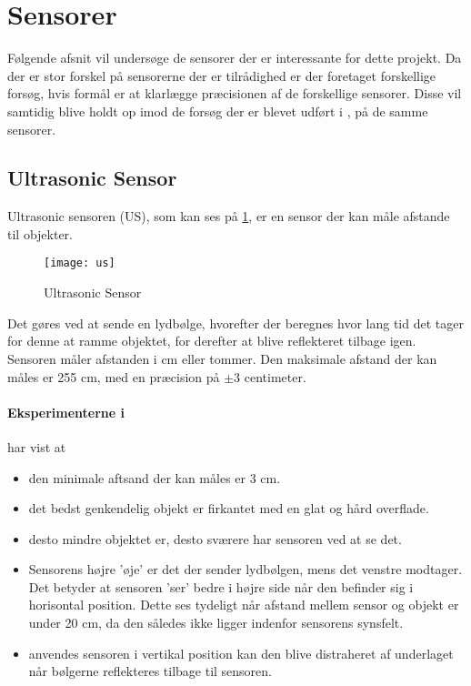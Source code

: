 \section{Sensorer}
Følgende afsnit vil undersøge de sensorer der er interessante for dette projekt.
Da der er stor forskel på sensorerne der er tilrådighed er der foretaget forskellige forsøg, hvis formål er at klarlægge præcisionen af de forskellige sensorer.
Disse vil samtidig blive holdt op imod de forsøg der er blevet udført i \citet{tikNXT}, på de samme sensorer.

\subsection{Ultrasonic Sensor}
Ultrasonic sensoren (US), som kan ses på \cref{sensor:ultrasonic_sensor}, er en sensor der kan måle afstande til objekter.

\begin{figure}[h]
\centering
\texttt{[image: us]}
\caption{\legoms Ultrasonic Sensor}
\label{sensor:ultrasonic_sensor}
\end{figure}

Det gøres ved at sende en lydbølge, hvorefter der beregnes hvor lang tid det tager for denne at ramme objektet, for derefter at blive reflekteret tilbage igen.
Sensoren måler afstanden i cm eller tommer.
Den maksimale afstand der kan måles er 255 cm, med en præcision på $\pm$3 centimeter.\cite{tikNXT}

\paragraph{Eksperimenterne i \citet{tikNXT}} har vist at 
\begin{itemize}
\item den minimale aftsand der kan måles er 3 cm.
\item det bedst genkendelig objekt er firkantet med en glat og hård overflade.
\item desto mindre objektet er, desto sværere har sensoren ved at se det.
\item Sensorens højre 'øje' er det der sender lydbølgen, mens det venstre modtager.
Det betyder at sensoren 'ser' bedre i højre side når den befinder sig i horisontal position.
Dette ses tydeligt når afstand mellem sensor og objekt er under 20 cm, da den således ikke ligger indenfor sensorens synsfelt.
\item anvendes sensoren i vertikal position kan den blive distraheret af underlaget når bølgerne reflekteres tilbage til sensoren.
\end{itemize}


